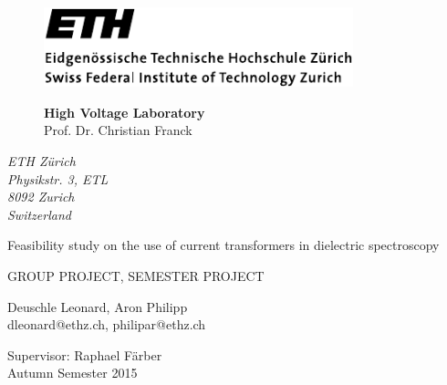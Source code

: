 


\pagestyle{empty}

\begin{figure}
    \begin{minipage}[b]{0.5\linewidth}
        \includegraphics[width=0.8\textwidth]{figures/ethlogo}
    \end{minipage}
    \hfill
    \begin{minipage}[b]{0.45\linewidth}
        \flushright
        \textbf{High Voltage Laboratory}\\
        \vspace{3mm}
        Prof. Dr. Christian Franck
    \end{minipage}
\end{figure}


\begin{flushright}
    \textit{ETH Z\"urich\\
    Physikstr. 3, ETL\\
    8092 Zurich\\
    Switzerland}
\end{flushright}

\phantom{u}
\vspace{1.5cm}
\begin{center}


\Huge{\sc Feasibility study on the use of current transformers in dielectric spectroscopy}
\vspace{1.5cm}

\Large
GROUP PROJECT, SEMESTER PROJECT\\
\end{center}

\vspace*{5cm} \large
\noindent
Deuschle Leonard, Aron Philipp\\
\noindent
dleonard@ethz.ch, philipar@ethz.ch

\normalsize

\vspace{1.5cm}
\noindent
Supervisor: Raphael F\"arber\\
\noindent
Autumn Semester 2015